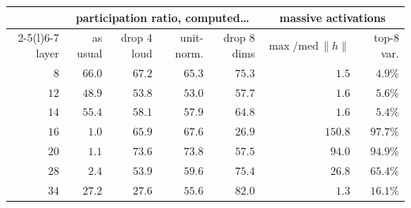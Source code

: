 \begin{tabular}{@{}rrrrrrr@{}}
\toprule
& \multicolumn{4}{c}{participation ratio, computed\ldots} & \multicolumn{2}{c}{massive activations} \\
\cmidrule(lr){2-5}\cmidrule(l){6-7}
layer & as usual & drop 4 loud & unit-norm. & drop 8 dims & $\max/\mathrm{med}\,\|h\|$ & top-8 var. \\
\midrule
$8$ & $66.0$ & $67.2$ & $65.3$ & $75.3$ & $1.5$ & $4.9\%$ \\
$12$ & $48.9$ & $53.8$ & $53.0$ & $57.7$ & $1.6$ & $5.6\%$ \\
$14$ & $55.4$ & $58.1$ & $57.9$ & $64.8$ & $1.6$ & $5.4\%$ \\
$16$ & $1.0$ & $65.9$ & $67.6$ & $26.9$ & $150.8$ & $97.7\%$ \\
$20$ & $1.1$ & $73.6$ & $73.8$ & $57.5$ & $94.0$ & $94.9\%$ \\
$28$ & $2.4$ & $53.9$ & $59.6$ & $75.4$ & $26.8$ & $65.4\%$ \\
$34$ & $27.2$ & $27.6$ & $55.6$ & $82.0$ & $1.3$ & $16.1\%$ \\
\bottomrule
\end{tabular}

